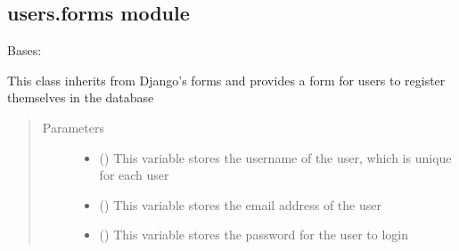 \documentclass[letterpaper,10pt,english]{sphinxmanual}
\begin{document}
\subsection{users.forms module}
\label{\detokenize{users:module-users.forms}}\label{\detokenize{users:users-forms-module}}

\begin{fulllineitems}
\label{\detokenize{users:users.forms.UserForm}}
\sphinxAtStartPar
Bases: 

\sphinxAtStartPar
This class inherits from Django’s forms and provides a form for users to register themselves in the database
\begin{quote}\begin{description}
\item[{Parameters}] \leavevmode\begin{itemize}
\item {} 
\sphinxAtStartPar
{} () \textendash{} This variable stores the username of the user, which is unique for each user

\item {} 
\sphinxAtStartPar
{} () \textendash{} This variable stores the email address of the user

\item {} 
\sphinxAtStartPar
{} () \textendash{} This variable stores the password for the user to login


\end{itemize}
\end{description}
\end{quote}
\end{fulllineitems}
\end{document}
